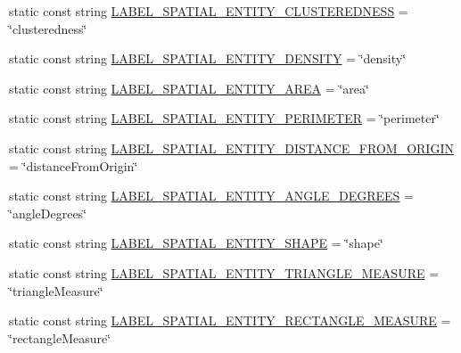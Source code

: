 \begin{DoxyCompactItemize}
\item 
static const string \hyperlink{classmultiscale_1_1analysis_1_1Detector_adae62b15a836592fd35057cf037730d8}{L\-A\-B\-E\-L\-\_\-\-S\-P\-A\-T\-I\-A\-L\-\_\-\-E\-N\-T\-I\-T\-Y\-\_\-\-C\-L\-U\-S\-T\-E\-R\-E\-D\-N\-E\-S\-S} = \char`\"{}clusteredness\char`\"{}
\item 
static const string \hyperlink{classmultiscale_1_1analysis_1_1Detector_ab4f91117dab09a9356422d839aba811f}{L\-A\-B\-E\-L\-\_\-\-S\-P\-A\-T\-I\-A\-L\-\_\-\-E\-N\-T\-I\-T\-Y\-\_\-\-D\-E\-N\-S\-I\-T\-Y} = \char`\"{}density\char`\"{}
\item 
static const string \hyperlink{classmultiscale_1_1analysis_1_1Detector_a163a0858c9d71d9ddac78f814d48bee6}{L\-A\-B\-E\-L\-\_\-\-S\-P\-A\-T\-I\-A\-L\-\_\-\-E\-N\-T\-I\-T\-Y\-\_\-\-A\-R\-E\-A} = \char`\"{}area\char`\"{}
\item 
static const string \hyperlink{classmultiscale_1_1analysis_1_1Detector_adc07a468da3a48acbb858c6a8de7dec2}{L\-A\-B\-E\-L\-\_\-\-S\-P\-A\-T\-I\-A\-L\-\_\-\-E\-N\-T\-I\-T\-Y\-\_\-\-P\-E\-R\-I\-M\-E\-T\-E\-R} = \char`\"{}perimeter\char`\"{}
\item 
static const string \hyperlink{classmultiscale_1_1analysis_1_1Detector_a58a41d2e2ccdbf3c760823d51ce9b0fe}{L\-A\-B\-E\-L\-\_\-\-S\-P\-A\-T\-I\-A\-L\-\_\-\-E\-N\-T\-I\-T\-Y\-\_\-\-D\-I\-S\-T\-A\-N\-C\-E\-\_\-\-F\-R\-O\-M\-\_\-\-O\-R\-I\-G\-I\-N} = \char`\"{}distance\-From\-Origin\char`\"{}
\item 
static const string \hyperlink{classmultiscale_1_1analysis_1_1Detector_a5cb6f0a78406631f55d4a1b11197652e}{L\-A\-B\-E\-L\-\_\-\-S\-P\-A\-T\-I\-A\-L\-\_\-\-E\-N\-T\-I\-T\-Y\-\_\-\-A\-N\-G\-L\-E\-\_\-\-D\-E\-G\-R\-E\-E\-S} = \char`\"{}angle\-Degrees\char`\"{}
\item 
static const string \hyperlink{classmultiscale_1_1analysis_1_1Detector_ae824ff121054358172ebf21aab8a8b46}{L\-A\-B\-E\-L\-\_\-\-S\-P\-A\-T\-I\-A\-L\-\_\-\-E\-N\-T\-I\-T\-Y\-\_\-\-S\-H\-A\-P\-E} = \char`\"{}shape\char`\"{}
\item 
static const string \hyperlink{classmultiscale_1_1analysis_1_1Detector_a7776a488915b9d47f678d87161c0478f}{L\-A\-B\-E\-L\-\_\-\-S\-P\-A\-T\-I\-A\-L\-\_\-\-E\-N\-T\-I\-T\-Y\-\_\-\-T\-R\-I\-A\-N\-G\-L\-E\-\_\-\-M\-E\-A\-S\-U\-R\-E} = \char`\"{}triangle\-Measure\char`\"{}
\item 
static const string \hyperlink{classmultiscale_1_1analysis_1_1Detector_acb2040a9a63a40fa4c4ff31af9a574b5}{L\-A\-B\-E\-L\-\_\-\-S\-P\-A\-T\-I\-A\-L\-\_\-\-E\-N\-T\-I\-T\-Y\-\_\-\-R\-E\-C\-T\-A\-N\-G\-L\-E\-\_\-\-M\-E\-A\-S\-U\-R\-E} = \char`\"{}rectangle\-Measure\char`\"{}

\end{DoxyCompactItemize}

